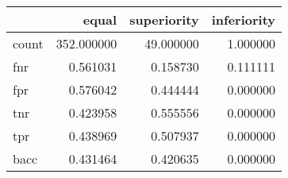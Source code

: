 \begin{tabular}{lrrr}
\toprule
{} &       equal &  superiority &  inferiority \\
\midrule
count &  352.000000 &    49.000000 &     1.000000 \\
fnr   &    0.561031 &     0.158730 &     0.111111 \\
fpr   &    0.576042 &     0.444444 &     0.000000 \\
tnr   &    0.423958 &     0.555556 &     0.000000 \\
tpr   &    0.438969 &     0.507937 &     0.000000 \\
bacc  &    0.431464 &     0.420635 &     0.000000 \\
\bottomrule
\end{tabular}
